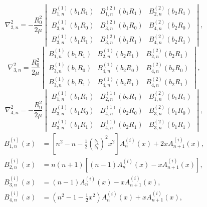 \begin{equation*}
	\nabla^2_{2,n} = -\frac{R_0^2}{2\mu}\begin{vmatrix}
		B_{1,n}^{(1)}(b_1 R_1) & B_{1,n}^{(2)}(b_1 R_1) & B_{2,n}^{(2)}(b_2 R_1)\\
		B_{3,n}^{(1)}(b_1 R_0) & B_{3,n}^{(2)}(b_1 R_0) & B_{4,n}^{(2)}(b_2 R_0)\\
		B_{3,n}^{(1)}(b_1 R_1) & B_{3,n}^{(2)}(b_1 R_1) & B_{4,n}^{(2)}(b_2 R_1)
	\end{vmatrix},
\end{equation*}
\begin{equation*}
	\nabla^2_{3,n} = \frac{R_0^2}{2\mu}\begin{vmatrix}
		B_{1,n}^{(1)}(b_1 R_1) & B_{2,n}^{(1)}(b_2 R_1) & B_{2,n}^{(2)}(b_2 R_1)\\
		B_{3,n}^{(1)}(b_1 R_0) & B_{4,n}^{(1)}(b_2 R_0) & B_{4,n}^{(2)}(b_2 R_0)\\
		B_{3,n}^{(1)}(b_1 R_1) & B_{4,n}^{(1)}(b_2 R_1) & B_{4,n}^{(2)}(b_2 R_1)
	\end{vmatrix},
\end{equation*}
\begin{equation*}
	\nabla^2_{4,n} = -\frac{R_0^2}{2\mu}\begin{vmatrix}
		B_{1,n}^{(1)}(b_1 R_1) & B_{2,n}^{(1)}(b_2 R_1) & B_{1,n}^{(2)}(b_1 R_1)\\
		B_{3,n}^{(1)}(b_1 R_0) & B_{4,n}^{(1)}(b_2 R_0) & B_{3,n}^{(2)}(b_1 R_0)\\
		B_{3,n}^{(1)}(b_1 R_1) & B_{4,n}^{(1)}(b_2 R_1) & B_{3,n}^{(2)}(b_1 R_1)
	\end{vmatrix},
\end{equation*}
\begin{align*}
	B_{1,n}^{(i)}(x) &= \left[n^2-n-\frac{1}{2}\left(\frac{b_2}{b_1}\right)^2 x^2\right] A_n^{(i)}(x) + 2xA_{n+1}^{(i)}(x),\\
	B_{2,n}^{(i)}(x) &= n(n+1)\left[(n-1)A_n^{(i)}(x) - xA_{n+1}^{(i)}(x)\right],\\
	B_{3,n}^{(i)}(x) &= (n-1) A_n^{(i)}(x) - xA_{n+1}^{(i)}(x),\\
	B_{4,n}^{(i)}(x) &= \left(n^2-1-\frac{1}{2}x^2\right) A_n^{(i)}(x) + xA_{n+1}^{(i)}(x),
\end{align*}
